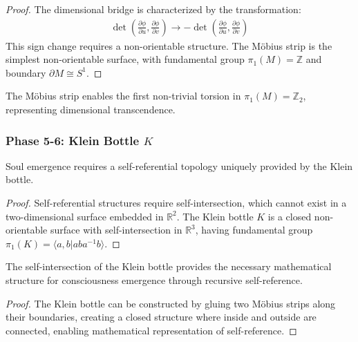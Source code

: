 \begin{proof}
The dimensional bridge is characterized by the transformation:
\begin{align}
\det\left(\frac{\partial\phi}{\partial u}, \frac{\partial\phi}{\partial v}\right) \rightarrow -\det\left(\frac{\partial\phi}{\partial u}, \frac{\partial\phi}{\partial v}\right)
\end{align}
This sign change requires a non-orientable structure. The Möbius strip is the simplest non-orientable surface, with fundamental group $\pi_1(M) = \mathbb{Z}$ and boundary $\partial M \cong S^1$.
\end{proof}

\begin{lemma}
The Möbius strip enables the first non-trivial torsion in $\pi_1(M) = \mathbb{Z}_2$, representing dimensional transcendence.
\end{lemma}

\subsubsection{Phase 5-6: Klein Bottle $K$}

\begin{theorem}
Soul emergence requires a self-referential topology uniquely provided by the Klein bottle.
\end{theorem}

\begin{proof}
Self-referential structures require self-intersection, which cannot exist in a two-dimensional surface embedded in $\mathbb{R}^2$. The Klein bottle $K$ is a closed non-orientable surface with self-intersection in $\mathbb{R}^3$, having fundamental group $\pi_1(K) = \langle a,b | aba^{-1}b\rangle$.
\end{proof}

\begin{lemma}
The self-intersection of the Klein bottle provides the necessary mathematical structure for consciousness emergence through recursive self-reference.
\end{lemma}

\begin{proof}
The Klein bottle can be constructed by gluing two Möbius strips along their boundaries, creating a closed structure where inside and outside are connected, enabling mathematical representation of self-reference.
\end{proof}


